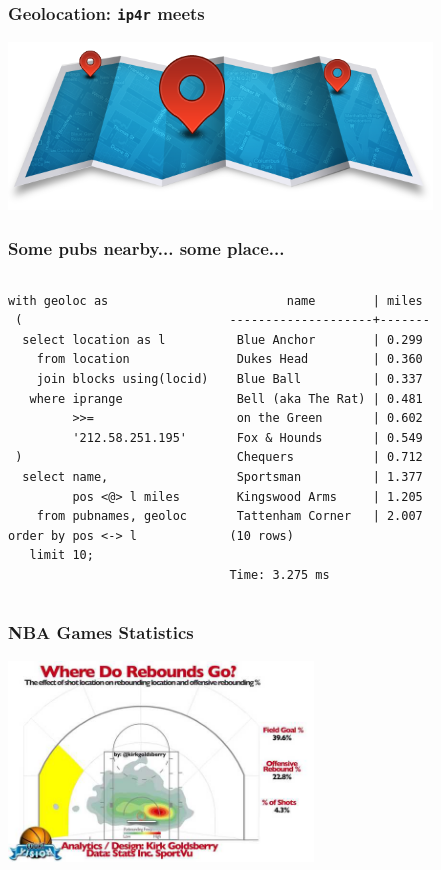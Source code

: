 \documentclass{beamer}
\begin{document}
\begin{frame}[fragile]
  \frametitle{Geolocation: \texttt{ip4r} meets }

\begin{center}
  \includegraphics[height=12em]{geolocation.png}
\end{center}
\end{frame}

\begin{frame}[fragile]
  \frametitle{Some pubs nearby... some place...}

\begin{columns}
\begin{verbatim}
with geoloc as
 (
  select location as l
    from location
    join blocks using(locid)
   where iprange
         >>=
         '212.58.251.195'
 )
  select name,
         pos <@> l miles
    from pubnames, geoloc
order by pos <-> l
   limit 10;
\end{verbatim}  
\begin{verbatim}
        name        | miles 
--------------------+-------
 Blue Anchor        | 0.299
 Dukes Head         | 0.360
 Blue Ball          | 0.337
 Bell (aka The Rat) | 0.481
 on the Green       | 0.602
 Fox & Hounds       | 0.549
 Chequers           | 0.712
 Sportsman          | 1.377
 Kingswood Arms     | 1.205
 Tattenham Corner   | 2.007
(10 rows)

Time: 3.275 ms
\end{verbatim}  
\end{columns}
\end{frame}

\begin{frame}
  \frametitle{NBA Games Statistics}

  \begin{center}
    \includegraphics[height=2.1in]{reboundsc1.jpg}
  \end{center}
\end{frame}
\end{document}
